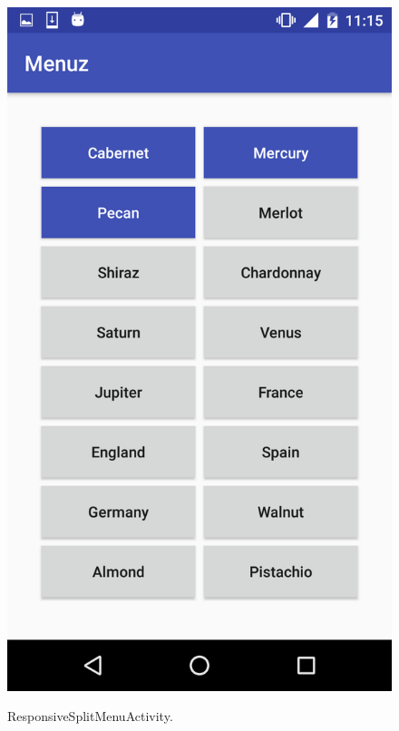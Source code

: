 \begin{figure}[!ht]
  \begin{center}
    \includegraphics[scale=0.22]{img/respsplit_menu.png}
    \label{fig:respsplit_menu}
    \caption{ResponsiveSplitMenuActivity.}
  \end{center}
\end{figure}

\newpage

